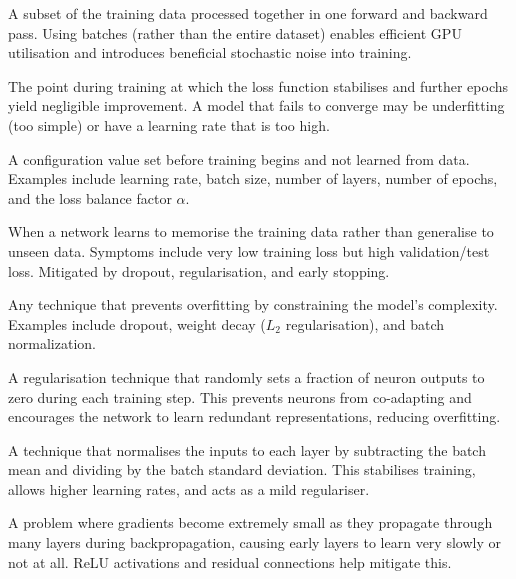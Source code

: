 \begin{description}[style=nextline, font=\normalfont\bfseries, leftmargin=1.5em]
    \item[Batch]
    A subset of the training data processed together in one forward
    and backward pass.  Using batches (rather than the entire dataset)
    enables efficient GPU utilisation and introduces beneficial
    stochastic noise into training.

    \item[Convergence]
    The point during training at which the loss function stabilises
    and further epochs yield negligible improvement.  A model that
    fails to converge may be underfitting (too simple) or have a
    learning rate that is too high.

    \item[Hyperparameter]
    A configuration value set before training begins and not learned
    from data.  Examples include learning rate, batch size, number of
    layers, number of epochs, and the loss balance factor $\alpha$.

    \item[Overfitting]
    When a network learns to memorise the training data rather than
    generalise to unseen data.  Symptoms include very low training
    loss but high validation/test loss.  Mitigated by dropout,
    regularisation, and early stopping.

    \item[Regularisation]
    Any technique that prevents overfitting by constraining the
    model's complexity.  Examples include dropout, weight decay
    ($L_2$ regularisation), and batch normalization.

    \item[Dropout]
    A regularisation technique that randomly sets a fraction of
    neuron outputs to zero during each training step.  This prevents
    neurons from co-adapting and encourages the network to learn
    redundant representations, reducing overfitting.

    \item[Batch Normalization (BatchNorm)]
    A technique that normalises the inputs to each layer by subtracting
    the batch mean and dividing by the batch standard deviation.  This
    stabilises training, allows higher learning rates, and acts as a
    mild regulariser.

    \item[Vanishing Gradients]
    A problem where gradients become extremely small as they propagate
    through many layers during backpropagation, causing early layers
    to learn very slowly or not at all.  ReLU activations and residual
    connections help mitigate this.


\end{description}

